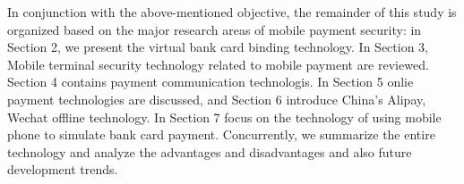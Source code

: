 \documentclass[journal]{IEEEtran}
\begin{document}
In conjunction with the above-mentioned objective, the remainder of this study is organized based on the major research areas of mobile payment security: in Section 2, we present the virtual bank card binding technology. In Section 3, Mobile terminal security technology related to mobile payment are reviewed. Section 4 contains payment communication technologis. In Section 5 onlie payment technologies are discussed, and Section 6 introduce China's Alipay, Wechat offline technology. In Section 7 focus on the technology of using mobile phone to simulate bank card payment. Concurrently, we summarize the entire technology and analyze the advantages and disadvantages and also future development trends.

\end{document}
